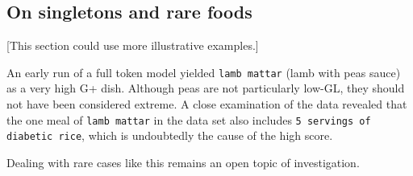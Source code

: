 \documentclass[conference]{IEEEtran}
\begin{document}
\subsection{On singletons and rare foods}

[This section could use more illustrative examples.]

An early run of a full token model yielded \texttt{lamb mattar} (lamb with peas sauce) as a very high G+ dish. Although peas are not particularly low-GL, they should not have been considered extreme. A close examination of the data revealed that the one meal of \texttt{lamb mattar} in the data set also includes \texttt{5 servings of diabetic rice}, which is undoubtedly the cause of the high score.

Dealing with rare cases like this remains an open topic of investigation.




\vspace{12pt}
\end{document}
